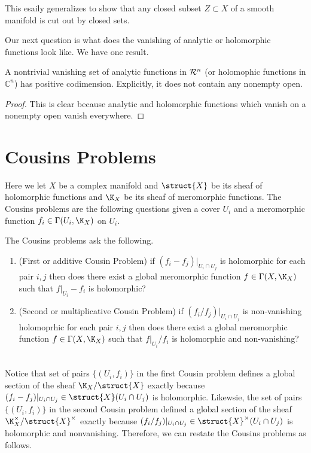 \documentclass[12pt]{article}
\begin{document}
\begin{rmk}
This esaily generalizes to show that any closed subset $Z \subset X$ of a smooth manifold is cut out by closed sets.
\end{rmk}
\noindent
Our next question is what does the vanishing of analytic or holomorphic functions look like. We have one result.

\begin{prop}
A nontrivial vanishing set of analytic functions in $\mathcal{R}^n$ (or holomophic functions in $\mathbb{C}^n$) has positive codimension. Explicitly, it does not contain any nonempty open. 
\end{prop}

\begin{proof}
This is clear because analytic and holomorphic functions which vanish on a nonempty open vanish everywhere. 
\end{proof}

\section{Cousins Problems}

Here we let $X$ be a complex manifold and $\struct{X}$ be its sheaf of holomorphic functions and $\K_X$ be its sheaf of meromorphic functions. The Cousins problems are the following questions given a cover $U_i$ and a meromorphic function $f_i \in \Gamma(U_i, \K_X)$ on $U_i$. 

\begin{defn}
The Cousins problems ask the following. 
\begin{enumerate}
\item (First or additive Cousin Problem) if $(f_i - f_j)|_{U_i \cap U_j}$ is holomorphic for each pair $i,j$ then does there exist a global meromorphic function $f \in \Gamma(X, \K_X)$ such that $f|_{U_i} - f_i$ is holomorphic?
\item (Second or multiplicative Cousin Problem) if $(f_i / f_j)|_{U_i \cap U_j}$ is non-vanishing holomoprhic for each pair $i,j$ then does there exist a global meromorphic function $f \in \Gamma(X, \K_X)$ such that $f|_{U_i} / f_i$ is holomorphic and non-vanishing?
\end{enumerate}
\end{defn}
\noindent\\
Notice that set of pairs $\{ (U_i, f_i) \}$ in the first Cousin problem defines a global section of the sheaf $\K_X / \struct{X}$ exactly because $(f_i - f_j)|_{U_i \cap U_j} \in \struct{X}(U_i \cap U_j)$ is holomorphic. Likewsie, the set of pairs $\{ (U_i, f_i) \}$ in the second Cousin problem defined a global section of the sheaf $\K_X^\times / \struct{X}^\times$ exactly because $(f_i / f_j) |_{U_i \cap U_j} \in \struct{X}^\times(U_i \cap U_j)$ is holomorphic and nonvanishing. Therefore, we can restate the Cousins problems as follows.
\end{document}
